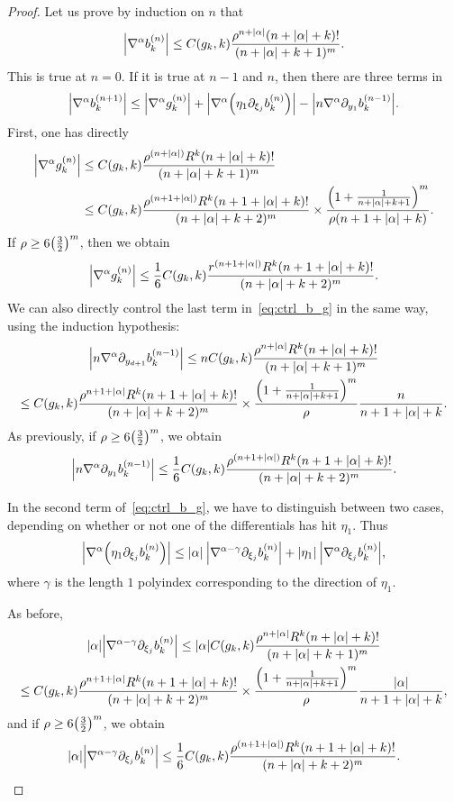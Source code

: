 \documentclass[AHL,Unicode,longabstracts,published]{cedram}
\newcommand\1{\mathds{1}}
\let\originalleft\left
\let\originalright\right
\renewcommand{\left}{\mathopen{}\mathclose\bgroup\originalleft}
\renewcommand{\right}{\aftergroup\egroup\originalright}
\begin{document}
\begin{proof}
Let us prove by induction on $n$ that
\[
\left|\nabla^{\alpha}b_k^{(n)}\right|\leq C(g_k,k)\frac{\rho^{n+|\alpha|}(n+|\alpha|+k)!}{(n+|\alpha|+k+1)^m}.
\]
This is true at $n=0$. If it is true at $n-1$ and $n$, then there are three terms in
\begin{equation}\label{eq:ctrl_b_g}
\left|\nabla^{\alpha}b_k^{(n+1)}\right|\leq\left|\nabla^{\alpha}g_k^{(n)}\right|+\left|\nabla^{\alpha}\left(\eta_{1}\partial_{\xi_j}b_k^{(n)}\right)\right|-
\left|n\nabla^{\alpha}\partial_{y_{1}}b_k^{(n-1)}\right|.
\end{equation}
First, one has directly
\begin{align*}
\left|\nabla^{\alpha}g_k^{(n)}\right|
&\leq C(g_k,k)\frac{\rho^{(n+|\alpha|)}R^k(n+|\alpha|+k)!}{(n+|\alpha|+k+1)^m}\\
&\leq C(g_k,k)\frac{\rho^{(n+1+|\alpha|)}R^k(n+1+|\alpha|+k)!}{(n+|\alpha|+k+2)^m}\times
\frac{\left(1+\frac{1}{n+|\alpha|+k+1}\right)^m}{\rho(n+1+|\alpha|+k)}.
\end{align*}
If $\rho\geq 6\left(\frac{3}{2}\right)^m$, then we obtain
\[
\left|\nabla^{\alpha}g_k^{(n)}\right|\leq
\frac{1}{6}C(g_k,k)\frac{r^{(n+1+|\alpha|)}R^k(n+1+|\alpha|+k)!}{(n+|\alpha|+k+2)^m}.
\]
We can also directly control the last term in~\eqref{eq:ctrl_b_g} in the same way, using the induction hypothesis:
\begin{multline*}
\left|n\nabla^{\alpha}\partial_{y_{d+1}}b_k^{(n-1)}\right|\leq nC(g_k,k)\frac{\rho^{n+|\alpha|}R^k(n+|\alpha|+k)!}{(n+|\alpha|+k+1)^m}\\
\leq C(g_k,k)\frac{\rho^{n+1+|\alpha|}R^k(n+1+|\alpha|+k)!}{(n+|\alpha|+k+2)^m}\times
\frac{\left(1+\frac{1}{n+|\alpha|+k+1}\right)^m}{\rho}\frac{n}{n+1+|\alpha|+k}.
\end{multline*}
As previously, if $\rho\geq 6\left(\frac 32\right)^m$, we obtain
\[
\left|n\nabla^{\alpha}\partial_{y_{1}}b_k^{(n-1)}\right|\leq
\frac{1}{6}C(g_k,k)\frac{\rho^{(n+1+|\alpha|)}R^k(n+1+|\alpha|+k)!}{(n+|\alpha|+k+2)^m}.
\]

In the second term of~\eqref{eq:ctrl_b_g}, we have to distinguish between two cases, depending on whether or not one of the differentials has hit $\eta_1$. Thus
\[
\left|\nabla^{\alpha}\left(\eta_{1}\partial_{\xi_j}b_k^{(n)}
\right)\right|\leq |\alpha|\:\left|\nabla^{\alpha-\gamma}\partial_{\xi_j}b_k^{(n)}\right|+|\eta_{1}|\:\left|\nabla^{\alpha}\partial_{\xi_j}b_k^{(n)}\right|,
\]
where $\gamma$ is the length $1$ polyindex corresponding to the direction of $\eta_{1}$.

As before,
\begin{multline*}
|\alpha|\left|\nabla^{\alpha-\gamma}\partial_{\xi_j}b_k^{(n)}\right|\leq |\alpha|C(g_k,k)\frac{\rho^{n+|\alpha|}R^k(n+|\alpha|+k)!}{(n+|\alpha|+k+1)^m}\\
\leq C(g_k,k)\frac{\rho^{n+1+|\alpha|}R^k(n+1+|\alpha|+k)!}{(n+|\alpha|+k+2)^m}\times
\frac{\left(1+\frac{1}{n+|\alpha|+k+1}\right)^m}{\rho}\frac{|\alpha|}{n+1+|\alpha|+k},
\end{multline*}
and if $\rho\geq 6\left(\frac 32\right)^m$, we obtain
\[
|\alpha|\left|\nabla^{\alpha-\gamma}\partial_{\xi_j}b_k^{(n)}\right|\leq
\frac{1}{6}C(g_k,k)\frac{\rho^{(n+1+|\alpha|)}R^k(n+1+|\alpha|+k)!}{(n+|\alpha|+k+2)^m}.
\]


\end{proof}
\end{document}
